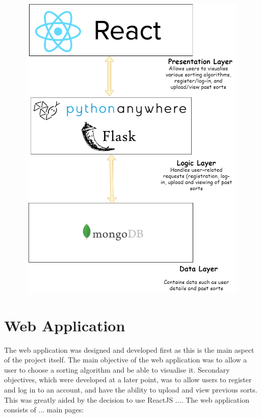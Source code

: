 \begin{center}
    \includegraphics[width=15cm,height=15cm,keepaspectratio]{images/system_design}
\end{center}
\newpage

\section{Web Application}
The web application was designed and developed first as this is the main aspect of the project itself. The main objective of the web application was to allow a user to choose a sorting algorithm and be able to visualise it. Secondary objectives, which were developed at a later point, was to allow users to register and log in to an account, and have the ability to upload and view previous sorts. This was greatly aided by the decision to use ReactJS .... The web application consists of ... main pages: 

